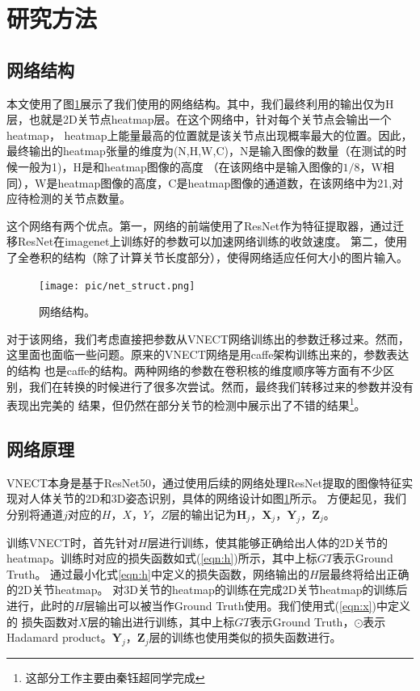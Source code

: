 \documentclass[a4paper, 10pt]{article}
\newcommand{\bX}{\mathbf{X}}
\newcommand{\bY}{\mathbf{Y}}
\newcommand{\bZ}{\mathbf{Z}}
\newcommand{\bH}{\mathbf{H}}
\begin{document}
\section{研究方法}

\subsection{网络结构}

\hspace{2em}本文使用了图\ref{pic:net_struct}展示了我们使用的网络结构。其中，我们最终利用的输出仅为H层，也就是2D关节点heatmap层。在这个网络中，针对每个关节点会输出一个heatmap，
heatmap上能量最高的位置就是该关节点出现概率最大的位置。因此，最终输出的heatmap张量的维度为(N,H,W,C)，N是输入图像的数量（在测试的时候一般为1)，H是和heatmap图像的高度
（在该网络中是输入图像的$1/8$，W相同），W是heatmap图像的高度，C是heatmap图像的通道数，在该网络中为21,对应待检测的关节点数量。

这个网络有两个优点。第一，网络的前端使用了ResNet\cite{he2016deep}作为特征提取器，通过迁移ResNet在imagenet上训练好的参数可以加速网络训练的收敛速度。
第二，使用了全巻积的结构（除了计算关节长度部分），使得网络适应任何大小的图片输入。

\begin{figure}[ht!]
    \centering
    \texttt{[image: pic/net\_struct.png]}
    \caption{网络结构。}
    \label{pic:net_struct}
\end{figure}

对于该网络，我们考虑直接把参数从VNECT网络训练出的参数迁移过来。然而，这里面也面临一些问题。原来的VNECT网络是用caffe架构训练出来的，参数表达的结构
也是caffe的结构。两种网络的参数在卷积核的维度顺序等方面有不少区别，我们在转换的时候进行了很多次尝试。然而，最终我们转移过来的参数并没有表现出完美的
结果，但仍然在部分关节的检测中展示出了不错的结果\footnote{这部分工作主要由秦钰超同学完成}。


\subsection{网络原理}

\hspace{2em}VNECT本身是基于ResNet50，通过使用后续的网络处理ResNet提取的图像特征实现对人体关节的2D和3D姿态识别，具体的网络设计如图\ref{pic:net_struct}所示。
方便起见，我们分别将通道$j$对应的$H$，$X$，$Y$，$Z$层的输出记为$\bH_j$，$\bX_j$，$\bY_j$，$\bZ_j$。

训练VNECT时，首先针对$H$层进行训练，使其能够正确给出人体的2D关节的heatmap。训练时对应的损失函数如式(\ref{eqn:h})所示，其中上标$GT$表示Ground Truth。
通过最小化式\ref{eqn:h}中定义的损失函数，网络输出的$H$层最终将给出正确的2D关节heatmap。
对3D关节的heatmap的训练在完成2D关节heatmap的训练后进行，此时的$H$层输出可以被当作Ground Truth使用。我们使用式(\ref{eqn:x})中定义的
损失函数对$X$层的输出进行训练，其中上标$GT$表示Ground Truth，$\odot$表示Hadamard product。$\bY_j$，$\bZ_j$层的训练也使用类似的损失函数进行。
\end{document}
